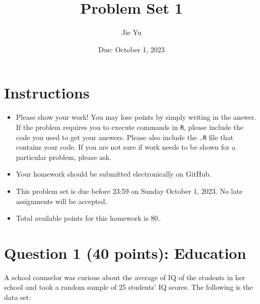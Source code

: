\documentclass[12pt,letterpaper]{article}
\title{Problem Set 1}
\date{Due: October 1, 2023}
\author{Jie Yu}
\begin{document}
	\maketitle
	
	\section*{Instructions}
	\begin{itemize}
	\item Please show your work! You may lose points by simply writing in the answer. If the problem requires you to execute commands in \texttt{R}, please include the code you used to get your answers. Please also include the \texttt{.R} file that contains your code. If you are not sure if work needs to be shown for a particular problem, please ask.
\item Your homework should be submitted electronically on GitHub.
\item This problem set is due before 23:59 on Sunday October 1, 2023. No late assignments will be accepted.
\item Total available points for this homework is 80.
	\end{itemize}
	
	\vspace{1cm}
	\section*{Question 1 (40 points): Education}

A school counselor was curious about the average of IQ of the students in her school and took a random sample of 25 students' IQ scores. The following is the data set:\\
\vspace{.5cm}
\end{document}
